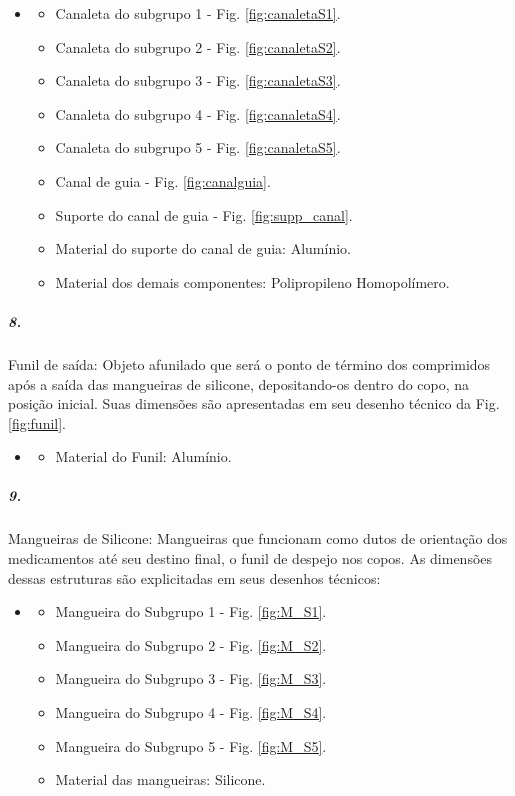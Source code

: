 \begin{itemize}
   \item[]
   \begin{itemize}
       \item Canaleta do subgrupo 1 - Fig. \ref{fig:canaletaS1}.
       \item Canaleta do subgrupo 2 - Fig. \ref{fig:canaletaS2}.
       \item Canaleta do subgrupo 3 - Fig. \ref{fig:canaletaS3}.
       \item Canaleta do subgrupo 4 - Fig. \ref{fig:canaletaS4}.
       \item Canaleta do subgrupo 5 - Fig. \ref{fig:canaletaS5}.
       \item Canal de guia - Fig. \ref{fig:canalguia}.
       \item Suporte do canal de guia - Fig. \ref{fig:supp_canal}.
       \item Material do suporte do canal de guia: Alumínio.
       \item Material dos demais componentes: Polipropileno Homopolímero.
   \end{itemize}
   \end{itemize}

 
 \subparagraph*{8.}\label{retorno_funil}
 Funil de saída: Objeto afunilado que será o ponto de término dos comprimidos após a saída das mangueiras de silicone, depositando-os dentro do copo, na posição inicial. Suas dimensões são apresentadas em seu desenho técnico da Fig. \ref{fig:funil}.
 
 \begin{itemize}
   \item[]
   \begin{itemize}
       \item  Material do Funil: Alumínio.
   \end{itemize}
   \end{itemize}
  
  
 \subparagraph*{9.}\label{retorno_mangueira}
 Mangueiras de Silicone: Mangueiras que funcionam como dutos de orientação dos medicamentos até seu destino final, o funil de despejo nos copos. As dimensões dessas estruturas são explicitadas em seus desenhos técnicos:
 
 
 \begin{itemize}
    \item[]
    \begin{itemize}
    \item  Mangueira do Subgrupo 1 - Fig. \ref{fig:M_S1}.
    \item  Mangueira do Subgrupo 2 - Fig. \ref{fig:M_S2}.
    \item  Mangueira do Subgrupo 3 - Fig. \ref{fig:M_S3}.
    \item  Mangueira do Subgrupo 4 - Fig. \ref{fig:M_S4}.
    \item  Mangueira do Subgrupo 5 - Fig. \ref{fig:M_S5}.
    \item Material das mangueiras: Silicone.
     \end{itemize}
 \end{itemize}
 

